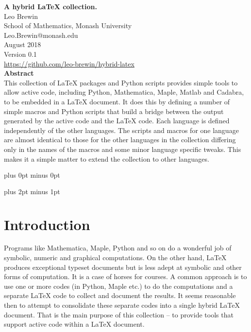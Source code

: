 \documentclass[12pt]{article}
\begin{document}


\begin{center}
   {\Large\bf A hybrid LaTeX collection.}\\[20pt]
   {Leo Brewin}\\[5pt]
   {School of Mathematics, Monash University}\\[5pt]
   {\tts Leo.Brewin@monash.edu}\\[5pt]
   {August 2018}\\[10pt]
   {Version 0.1}\\[10pt]
   {\href{https://github.com/leo-brewin/hybrid-latex}{https://github.com/leo-brewin/hybrid-latex}}\\[20pt]
   {\bf\small Abstract}\\[10pt]
   {\small{}%
      {This collection of LaTeX packages and Python scripts provides simple
      tools to allow active code, including Python, Mathematica, Maple, Matlab
      and Cadabra, to be embedded in a LaTeX document. It does this by defining
      a number of simple macros and Python scripts that build a bridge between
      the output generated by the active code and the LaTeX code. Each language
      is defined independently of the other languages. The scripts and macros
      for one language are almost identical to those for the other languages in
      the collection differing only in the names of the macros and some minor
      language specific tweaks. This makes it a simple matter to extend the
      collection to other languages.}}
\end{center}

\vskip 1cm

\parindent=0pt
\parskip=0pt plus 0pt minus 0pt

\tableofcontents

\vfill

\clearpage

\parindent=0pt
\parskip=8pt plus 2pt minus 1pt

\section{Introduction}

Programs like Mathematica, Maple, Python and so on do a wonderful job of symbolic,
numeric and graphical computations. On the other hand, LaTeX produces exceptional
typeset documents but is less adept at symbolic and other forms of computation. It
is a case of horses for courses. A common approach is to use one or more codes (in
Python, Maple etc.) to do the computations and a separate LaTeX code to collect and
document the results. It seems reasonable then to attempt to consolidate these
separate codes into a single hybrid LaTeX document. That is the main purpose of
this collection -- to provide tools that support active code within a LaTeX
document.
\end{document}
